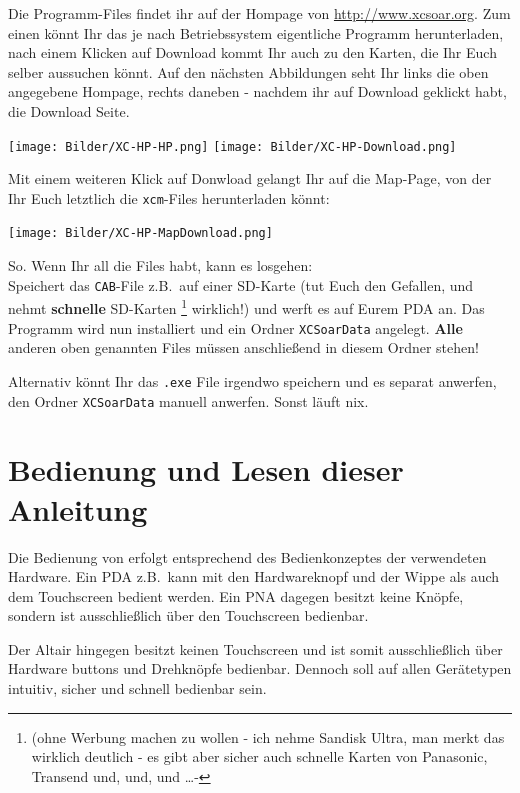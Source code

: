 Die Programm-Files findet ihr auf der Hompage von \xc \url{http://www.xcsoar.org}. Zum einen könnt Ihr das je nach Betriebssystem eigentliche Programm herunterladen, nach einem Klicken auf Download kommt Ihr auch zu den Karten, die Ihr Euch selber aussuchen könnt.
Auf den nächsten Abbildungen seht Ihr links die oben angegebene Hompage, rechts daneben - nachdem ihr auf Download geklickt habt, die Download Seite.
%
\begin{center}
\texttt{[image: Bilder/XC-HP-HP.png]}
\quad
\texttt{[image: Bilder/XC-HP-Download.png]}
\end{center}
%
Mit einem weiteren Klick auf Donwload gelangt Ihr auf die \textsf{Map}-Page, von der Ihr Euch letztlich die \texttt{xcm}-Files herunterladen könnt:
%
\begin{center}
\texttt{[image: Bilder/XC-HP-MapDownload.png]}
\end{center}
%

So. Wenn Ihr all die Files habt, kann es losgehen:\\[1em]

Speichert das \texttt{CAB}-File z.B.\ auf einer SD-Karte (tut Euch den Gefallen, und nehmt \textbf{schnelle} SD-Karten \footnote{(ohne Werbung machen zu wollen - ich nehme Sandisk Ultra, man merkt das wirklich deutlich - es gibt aber sicher auch schnelle Karten von Panasonic, Transend  und, und, und \dots - } wirklich!) und werft es \merkes auf Eurem \textsf{PDA} an. Das Programm wird  nun installiert und ein Ordner \texttt{XCSoarData} angelegt. \textbf{Alle} anderen oben genannten Files müssen anschließend in diesem Ordner stehen!

Alternativ könnt Ihr das \texttt{.exe} File irgendwo speichern und es separat anwerfen,
den Ordner \texttt{XCSoarData} manuell anwerfen. Sonst läuft nix.
%
\section{Bedienung und Lesen dieser Anleitung}
Die Bedienung von \xc erfolgt entsprechend des Bedienkonzeptes der verwendeten Hardware.
Ein \textsf{PDA} z.B.\ kann mit den Hardwareknopf und der Wippe als auch dem Touchscreen
bedient werden. Ein \textsf{PNA} dagegen besitzt keine Knöpfe, sondern ist ausschließlich über den Touchscreen bedienbar. 

Der \textsf{Altair} hingegen besitzt keinen Touchscreen und ist somit ausschließlich über Hardware buttons und Drehknöpfe bedienbar. Dennoch soll \xc auf allen Gerätetypen intuitiv, sicher und schnell bedienbar sein.


